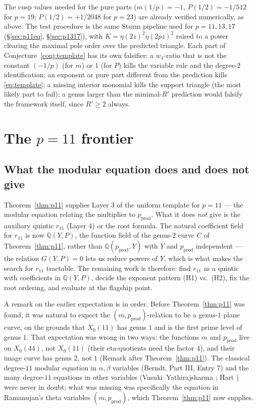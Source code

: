 \documentclass[11pt]{amsart}
\theoremstyle{plain}
\theoremstyle{definition}
\theoremstyle{remark}
\newcommand{\Q}{\mathbb{Q}}
\newcommand{\pprod}{p_{\mathrm{prod}}}
\begin{document}
The cusp values needed for the pure parts ($m(1/p) = -1$,
$P(1/2) = -1/512$ for $p = 19$; $P(1/2) = +1/2048$ for $p = 23$) are already
verified numerically, as above. The test procedure is the same Sturm pipeline
used for $p = 11, 13, 17$ (\S\ref{sec:p11eq}, \S\ref{sec:p1317}), with
$K = \eta(2z)^2\eta(2pz)^2$ raised to a power clearing the maximal pole order
over the predicted triangle. Each part of Conjecture~\ref{conj:template} has
its own falsifier: a $w_4$-ratio that is not the constant $(-1/p)$ (for $m$) or
$1$ (for $P$) kills the variable rule and the degree-$2$ identification; an
exponent or pure part different from the prediction kills \eqref{eq:template};
a missing interior monomial kills the support triangle (the most likely part
to fail); a genus larger than the minimal-$R'$ prediction would falsify the
framework itself, since $R' \geq 2$ always.

\section{The $p=11$ frontier}
\label{sec:p11}

\subsection{What the modular equation does and does not give}

Theorem~\ref{thm:p11} supplies Layer 3 of the uniform template for $p=11$ --- the
modular equation relating the multiplier to $\pprod$. What it does \emph{not} give
is the auxiliary quintic $r_{11}$ (Layer 4) or the root formula. The natural
coefficient field for $r_{11}$ is now $\Q(Y,P)$, the function field of the genus-$2$
curve $C$ of Theorem~\ref{thm:p11}, rather than $\Q(\pprod, Y)$ with $Y$ and
$\pprod$ independent --- the relation $G(Y,P) = 0$ lets us reduce powers of $Y$,
which is what makes the search for $r_{11}$ tractable. The remaining work is
therefore: find $r_{11}$ as a quintic with coefficients in $\Q(Y,P)$, decide the
exponent pattern (H1) vs.\ (H2), fix the root ordering, and evaluate at the
flagship point.

A remark on the earlier expectation is in order. Before Theorem~\ref{thm:p11} was
found, it was natural to expect the $(m,\pprod)$-relation to be a genus-$1$ plane
curve, on the grounds that $X_0(11)$ has genus $1$ and is the first prime level of
genus $1$. That expectation was wrong in two ways: the functions $m$ and $\pprod$
live on $X_0(44)$, not $X_0(11)$ (their eta-quotients need the factor $4$), and
their image curve has genus $2$, not $1$ (Remark after Theorem~\ref{thm:p11}). The
classical degree-$11$ modular equation in $\alpha,\beta$ variables (Berndt, Part
III, Entry 7) and the many degree-$11$ equations in other variables
(Vasuki--Yathirajsharma \cite{VY23}; Hart \cite{Hart08}) were never in doubt; what
was missing was specifically the equation in Ramanujan's theta variables
$(m,\pprod)$, which Theorem~\ref{thm:p11} now supplies.
\end{document}
